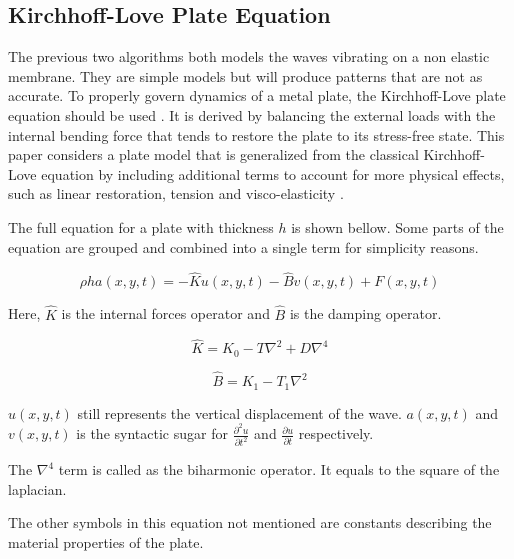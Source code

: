 \subsection{Kirchhoff-Love Plate Equation}
The previous two algorithms both models the waves vibrating on a non elastic membrane. They are simple models but will produce patterns that are not as accurate. To properly govern dynamics of a metal plate, the Kirchhoff-Love plate equation should be used \autocite{kirchhoff1850scheibe}\autocite{love1888shell}. It is derived by balancing the external loads with the internal bending force that tends to restore the plate to its stress-free state. This paper considers a plate model that is generalized from the classical Kirchhoff-Love equation by including additional terms to account for more physical effects, such as linear restoration, tension and visco-elasticity \autocite{nguyen2021kirchhofflove}.

The full equation for a plate with thickness $h$ is shown bellow. Some parts of the equation are grouped and combined into a single term for simplicity reasons.

\begin{equation}
    \rho h a(x,y,t) = -\hat{K}u(x,y,t) - \hat{B}v(x,y,t) + F(x,y,t)
\end{equation}

Here, $\hat{K}$ is the internal forces operator and $\hat{B}$ is the damping operator.

\begin{equation}
    \hat{K} = K_0 - T\nabla^2 + D\nabla^4
\end{equation}

\begin{equation}
    \hat{B} = K_1 - T_1\nabla^2
\end{equation}

$u(x,y,t)$ still represents the vertical displacement of the wave. $a(x,y,t)$ and $v(x,y,t)$ is the syntactic sugar for $\frac{\partial^2u}{\partial t^2}$ and $\frac{\partial u}{\partial t}$ respectively.

The $\nabla^4$ term is called as the biharmonic operator. It equals to the square of the laplacian.

The other symbols in this equation not mentioned are constants describing the material properties of the plate.

